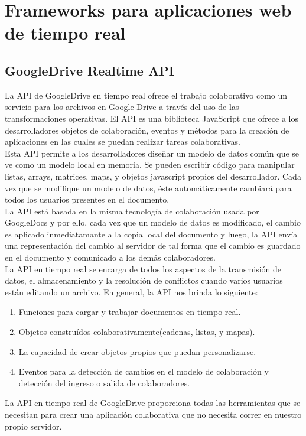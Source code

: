 \newpage
\section{Frameworks para aplicaciones web de tiempo real}

\subsection{GoogleDrive Realtime API}

La API de GoogleDrive en tiempo real ofrece el trabajo colaborativo como un servicio para los archivos en Google Drive a través del uso de las transformaciones operativas. El API es una biblioteca JavaScript que ofrece a los desarrolladores objetos de colaboración, eventos y métodos para la creación de aplicaciones en las cuales se puedan realizar tareas colaborativas.\\

Esta API permite a los desarrolladores diseñar un modelo de datos común que se ve como un modelo local en memoria. Se pueden escribir código para manipular listas, arrays, matrices, maps, y objetos javascript propios del desarrollador. Cada vez que se modifique un modelo de datos, éste automáticamente cambiará para todos los usuarios presentes en el documento.\\

La API está basada en la misma tecnología de colaboración usada por GoogleDocs y por ello, cada vez que un modelo de datos es modificado, el cambio es aplicado inmediatamante a la copia local del documento y luego, la API envía una representación del cambio al servidor de tal forma que el cambio es guardado en el documento y comunicado a los demás colaboradores.\\

La API en tiempo real se encarga de todos los aspectos de la transmisión de datos, el almacenamiento y la resolución de conflictos cuando varios usuarios están editando un archivo. En general, la API nos brinda lo siguiente:

\begin{enumerate}
  \item Funciones para cargar y trabajar documentos en tiempo real.
  \item Objetos construídos colaborativamente(cadenas, listas, y mapas).
  \item La capacidad de crear objetos propios que puedan personalizarse.
  \item Eventos para la detección de cambios en el modelo de colaboración y detección del ingreso o salida de colaboradores.
\end{enumerate}
La API en tiempo real de GoogleDrive proporciona todas las herramientas que se necesitan para crear una aplicación colaborativa que no necesita correr en nuestro propio servidor.


